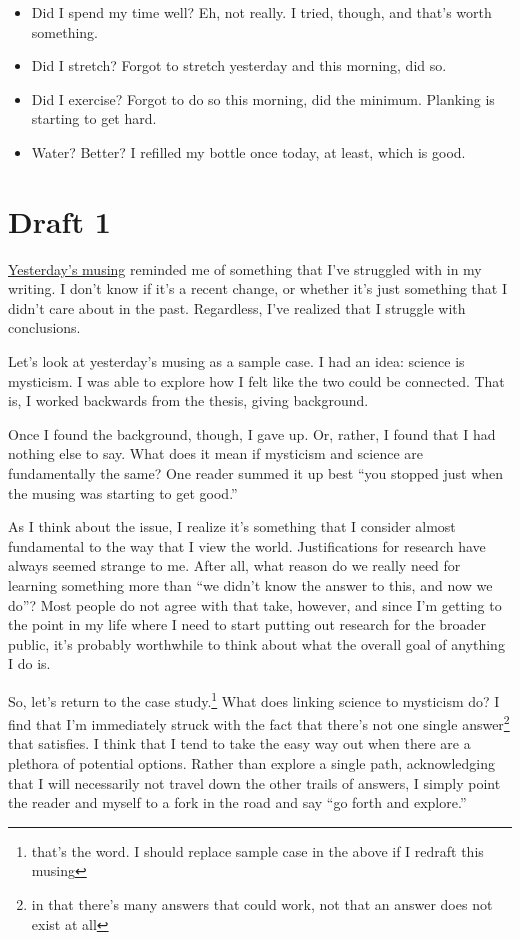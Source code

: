 \documentclass[12pt]{article}[titlepage]
\newcommand{\say}[1]{``#1''}
\newcommand{\1}{\={a}}
\newcommand{\2}{\={e}}
\newcommand{\3}{\={\i}}
\newcommand{\4}{\=o}
\newcommand{\5}{\=u}
\newcommand{\6}{\={A}}
\renewcommand{\,}{\textsuperscript{,}}
\begin{document}
\begin{itemize}
\begin{itemize}
\item Did I spend my time well? Eh, not really. I tried, though, and that's worth something.
\item Did I stretch? Forgot to stretch yesterday and this morning, did so.
\item Did I exercise? Forgot to do so this morning, did the minimum. Planking is starting to get hard.
\item Water? Better? I refilled my bottle once today, at least, which is good.
\end{itemize}
\end{itemize}


\section{Draft 1}
\href{science-mysticism.html}{Yesterday's musing} reminded me of something that I've struggled with in my writing.
I don't know if it's a recent change, or whether it's just something that I didn't care about in the past.
Regardless, I've realized that I struggle with conclusions.

Let's look at yesterday's musing as a sample case.
I had an idea: science is mysticism.
I was able to explore how I felt like the two could be connected.
That is, I worked backwards from the thesis, giving background.

Once I found the background, though, I gave up.
Or, rather, I found that I had nothing else to say.
What does it mean if mysticism and science are fundamentally the same?
One reader summed it up best \say{you stopped just when the musing was starting to get good.}

As I think about the issue, I realize it's something that I consider almost fundamental to the way that I view the world.
Justifications for research have always seemed strange to me.
After all, what reason do we really need for learning something more than \say{we didn't know the answer to this, and now we do}?
Most people do not agree with that take, however, and since I'm getting to the point in my life where I need to start putting out research for the broader public, it's probably worthwhile to think about what the overall goal of anything I do is.

So, let's return to the case study.\footnote{that's the word. I should replace sample case in the above if I redraft this musing}
What does linking science to mysticism do?
I find that I'm immediately struck with the fact that there's not one single answer\footnote{in that there's many answers that could work, not that an answer does not exist at all} that satisfies.
I think that I tend to take the easy way out when there are a plethora of potential options.
Rather than explore a single path, acknowledging that I will necessarily not travel down the other trails of answers, I simply point the reader and myself to a fork in the road and say \say{go forth and explore.}
\end{document}
